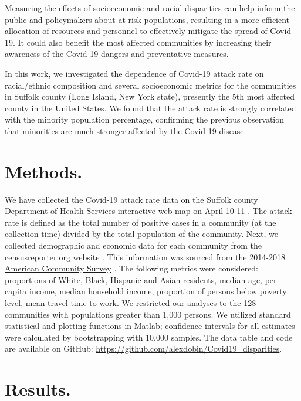 \documentclass[twoside,12pt,onecolumn]{article}
\begin{document}
Measuring the effects of socioeconomic and racial disparities can help inform the public and policymakers about at-risk populations, resulting in a more efficient allocation of resources and personnel to effectively mitigate the spread of Covid-19. It could also benefit the most affected communities by increasing their awareness of the Covid-19 dangers and preventative measures.

In this work, we investigated the dependence of Covid-19 attack rate on racial/ethnic composition and several socioeconomic metrics for the communities in Suffolk county (Long Island, New York state), presently the 5th most affected county in the United States. We found that the attack rate is strongly correlated with the minority population percentage, confirming the previous observation that minorities are much stronger affected by the Covid-19 disease.

\section{Methods.}
We have collected the Covid-19 attack rate data on the Suffolk county Department of Health Services interactive \href{https://gis.suffolkcountyny.gov/portal/apps/opsdashboard/index.html#/76a26a0c83634266aa9efc35bd4f1975}{web-map} on April 10-11 \cite{SuffolkWebMap}.
The attack rate is defined as the total number of positive cases in a community (at the collection time) divided by the total population of the community. Next, we collected demographic and economic data for each community from the \href{censusreporter.org} {censusreporter.org} website \cite{CensusReporter}.
This information was sourced from the \href{https://www.census.gov/newsroom/press-releases/2019/acs-5-year.html}{2014-2018 American Community Survey} \cite{ACS}.  The following metrics were considered: proportions of White, Black, Hispanic and Asian residents, median age, per capita income, median household income, proportion of persons below poverty level, mean travel time to work.
We restricted our analyses to the 128 communities with populations greater than 1,000 persons. We utilized standard statistical and plotting functions in Matlab; confidence intervals for all estimates were calculated by bootstrapping with 10,000 samples. The data table and code are available on GitHub: \url{https://github.com/alexdobin/Covid19_disparities}.

\section{Results.}
\end{document}
